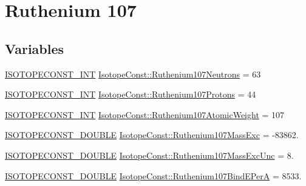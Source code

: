 \hypertarget{group___isotope_const-_ruthenium-_ru107}{}\section{Ruthenium 107}
\label{group___isotope_const-_ruthenium-_ru107}
\subsection*{Variables}
\begin{DoxyCompactItemize}
\item 
\mbox{\hyperlink{group___isotope_const-_macros_ga5f18360b3e99483a35c32d789e62621c}{I\+S\+O\+T\+O\+P\+E\+C\+O\+N\+S\+T\+\_\+\+I\+NT}} \mbox{\hyperlink{group___isotope_const-_ruthenium-_ru107_ga8e8006a0894d4a55d9ce3837ae5570c3}{Isotope\+Const\+::\+Ruthenium107\+Neutrons}} = 63
\item 
\mbox{\hyperlink{group___isotope_const-_macros_ga5f18360b3e99483a35c32d789e62621c}{I\+S\+O\+T\+O\+P\+E\+C\+O\+N\+S\+T\+\_\+\+I\+NT}} \mbox{\hyperlink{group___isotope_const-_ruthenium-_ru107_ga650a814d1ae529efac2e21ad68769637}{Isotope\+Const\+::\+Ruthenium107\+Protons}} = 44
\item 
\mbox{\hyperlink{group___isotope_const-_macros_ga5f18360b3e99483a35c32d789e62621c}{I\+S\+O\+T\+O\+P\+E\+C\+O\+N\+S\+T\+\_\+\+I\+NT}} \mbox{\hyperlink{group___isotope_const-_ruthenium-_ru107_ga2ac95961b9f62c64b54e9eabe5171ddc}{Isotope\+Const\+::\+Ruthenium107\+Atomic\+Weight}} = 107
\item 
\mbox{\hyperlink{group___isotope_const-_macros_ga8f45a7272ce02c0b4c65c44636ed719a}{I\+S\+O\+T\+O\+P\+E\+C\+O\+N\+S\+T\+\_\+\+D\+O\+U\+B\+LE}} \mbox{\hyperlink{group___isotope_const-_ruthenium-_ru107_ga207f9c14042ed7816c559ee4ad7cef60}{Isotope\+Const\+::\+Ruthenium107\+Mass\+Exc}} = -\/83862.
\item 
\mbox{\hyperlink{group___isotope_const-_macros_ga8f45a7272ce02c0b4c65c44636ed719a}{I\+S\+O\+T\+O\+P\+E\+C\+O\+N\+S\+T\+\_\+\+D\+O\+U\+B\+LE}} \mbox{\hyperlink{group___isotope_const-_ruthenium-_ru107_ga4a12a26d83fb8e852953719a09edd9cf}{Isotope\+Const\+::\+Ruthenium107\+Mass\+Exc\+Unc}} = 8.
\item 
\mbox{\hyperlink{group___isotope_const-_macros_ga8f45a7272ce02c0b4c65c44636ed719a}{I\+S\+O\+T\+O\+P\+E\+C\+O\+N\+S\+T\+\_\+\+D\+O\+U\+B\+LE}} \mbox{\hyperlink{group___isotope_const-_ruthenium-_ru107_gae2a78b089966929557515bf2d239aaf6}{Isotope\+Const\+::\+Ruthenium107\+Bind\+E\+PerA}} = 8533.
\item 

\end{DoxyCompactItemize}
